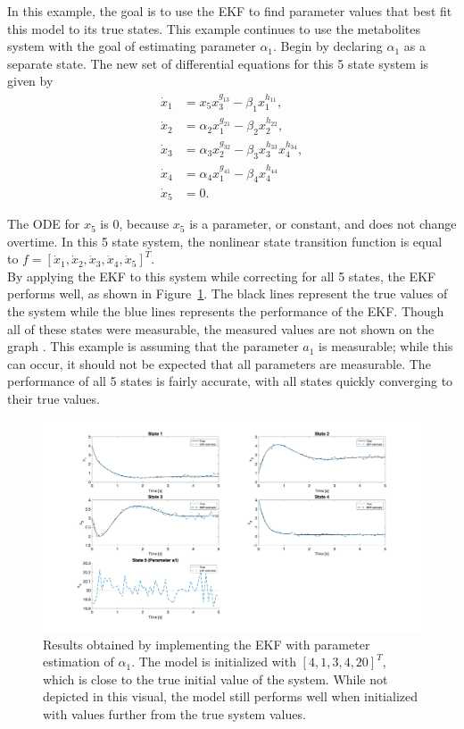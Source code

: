 \noindent In this example, the goal is to use the EKF to find parameter values that best fit this model to its true states. This example continues to use the metabolites system with the goal of estimating parameter $\alpha_1$. Begin by declaring $\alpha_1$ as a separate state. The new set of differential equations for this 5 state system is given by
\begin{align*}
\dot x_1 &= x_5 x_3^{g_{13}} - \beta_1 x_1^{h_{11}}, \\
\dot x_2 &= \alpha_2 x_1^{g_{21}} - \beta_2 x_2^{h_{22}}, \\
\dot x_3 &= \alpha_3 x_2^{g_{32}} - \beta_3 x_3^{h_{33}} x_4^{h_{34}}, \\
\dot x_4 &= \alpha_4  x_1^{g_{41}} - \beta_4 x_4^{h_{44}}\\
\dot x_5 &= 0.
\end{align*}


\noindent The ODE for $x_5$ is 0, because $x_5$ is a parameter, or constant, and does not change overtime. In this 5 state system, the nonlinear state transition function is equal to $f = [\dot x_1, \dot x_2, \dot x_3, \dot x_4, \dot x_5]^T$. \\


\noindent By applying the EKF to this system while correcting for all 5 states, the EKF performs well, as shown in Figure~\ref{fig:EKF_1param}. The black lines represent the true values of the system while the blue lines represents the performance of the EKF. Though all of these states were measurable, the measured values are not shown on the graph . This example is assuming that the parameter $a_1$ is measurable; while this can occur, it should not be expected that all parameters are measurable. The performance of all 5 states is fairly accurate, with all states quickly converging to their true values. \\

\newpage

\begin{figure}[h]
    \centering
    \includegraphics[scale = 0.24]{EKF_1param.png}
    \caption{Results obtained by implementing the EKF with parameter estimation of $\alpha_1$. The model is initialized with $[4, 1, 3, 4, 20]^T$, which is close to the true initial value of the system. While not depicted in this visual, the model still performs well when initialized with values further from the true system values. }
    \label{fig:EKF_1param}
\end{figure}


